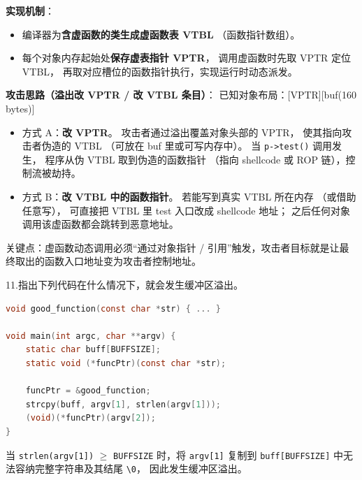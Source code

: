 \documentclass[UTF8]{ctexart}
\begin{document}
\begin{tcolorbox}[title=答题区, height=7cm]
\end{tcolorbox}


\noindent\textbf{实现机制}：

\begin{itemize}
  \item [(1)]编译器为\textbf{含虚函数的类生成虚函数表 VTBL}
        （函数指针数组）。
  \item [(2)]每个对象内存起始处\textbf{保存虚表指针 VPTR}，
        调用虚函数时先取 VPTR 定位 VTBL，
        再取对应槽位的函数指针执行，实现运行时动态派发。
\end{itemize}

\noindent\textbf{攻击思路（溢出改 VPTR / 改 VTBL 条目）}：
已知对象布局：[VPTR][buf(160 bytes)]
\begin{itemize}
  \item [(1)]方式 A：\textbf{改 VPTR}。
        攻击者通过溢出覆盖对象头部的 VPTR，
        使其指向攻击者伪造的 VTBL
        （可放在 buf 里或可写内存中）。
        当 \texttt{p->test()} 调用发生，
        程序从伪 VTBL 取到伪造的函数指针
        （指向 shellcode 或 ROP 链），控制流被劫持。
  \item [(2)]方式 B：\textbf{改 VTBL 中的函数指针}。
        若能写到真实 VTBL 所在内存
        （或借助任意写），
        可直接把 VTBL 里 test 入口改成 shellcode 地址；
        之后任何对象调用该虚函数都会跳转到恶意地址。
\end{itemize}

关键点：虚函数动态调用必须“通过对象指针 / 引用”触发，攻击者目标就是让最终取出的函数入口地址变为攻击者控制地址。

\noindent
11.指出下列代码在什么情况下，就会发生缓冲区溢出。

\begin{lstlisting}[language=C]
void good_function(const char *str) { ... }

void main(int argc, char **argv) {
    static char buff[BUFFSIZE];
    static void (*funcPtr)(const char *str);

    funcPtr = &good_function;
    strcpy(buff, argv[1], strlen(argv[1]));
    (void)(*funcPtr)(argv[2]);
}
\end{lstlisting}

\begin{tcolorbox}[title=答题区, height=3cm]
\end{tcolorbox}

当 \texttt{strlen(argv[1])} $\ge$ \texttt{BUFFSIZE} 时，将 \texttt{argv[1]} 复制到
\texttt{buff[BUFFSIZE]} 中无法容纳完整字符串及其结尾 \texttt{\textbackslash0}，
因此发生缓冲区溢出。
\end{document}

